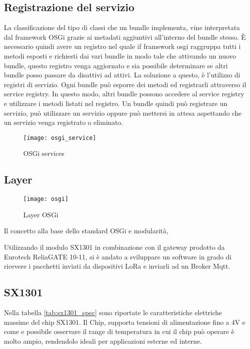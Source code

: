 \subsection{Registrazione del servizio}
La classificazione del tipo di classi che un bundle implementa, vine
interpretata dal framework OSGi grazie ai metadati aggiuntivi all'interno del
bundle stesso. È necessario quindi avere un registro nel quale if framework osgi
raggruppa tutti i metodi esposti e richiesti dai vari bundle in modo tale che 
attivando un nuovo bundle, questo registro venga aggiornato e sia possibile
determinare se altri bundle posso passare da disattivi ad attivi.
La soluzione a questo, è l'utilizzo di registri di servizio. Ogni bundle può
esporre dei metodi ed registrarli attraverso il service registry. In questo
modo, altri bundle possono accedere al service registry e utilizzare i metodi
listati nel registro. Un bundle quindi può registrare un servizio, può
utilizzare un servizio oppure può mettersi in attesa aspettando che un servizio
venga registrato o eliminato.
\begin{figure}[h]
\centering 
\texttt{[image: osgi\_service]}
\caption{OSGi services}
\label{}
\end{figure}
\subsection{Layer}
\begin{figure}[h]
\centering 
\texttt{[image: osgi]}
\caption{Layer OSGi}
\label{}
\end{figure}



Il concetto alla base dello standard OSGi e modularità,


Utilizzando il modulo SX1301 in combinazione con il gateway prodotto da Eurotech
ReliaGATE 10-11, si è andato a sviluppare un software in grado di ricevere i
pacchetti inviati da dispositivi LoRa e inviarli ad un Broker Mqtt.

\subsection{SX1301}
Nella tabella \ref{tab:sx1301_spec} sono riportate le caratteristiche elettriche
massime del  chip SX1301. Il Chip, supporta tensioni di
alimentazione fino a 4V e  come e possibile osservare il range di temperatura in cui il
chip può operare è molto ampio, rendendolo ideali per applicazioni esterne ed
interne. 

